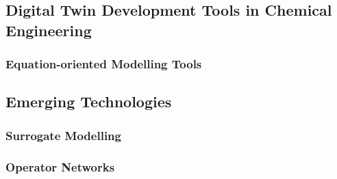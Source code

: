 \subsection{Digital Twin Development Tools in Chemical Engineering}


\subsubsection{Equation-oriented Modelling Tools}















\subsection{Emerging Technologies }





\subsubsection{Surrogate Modelling}

\subsubsection{Operator Networks}



